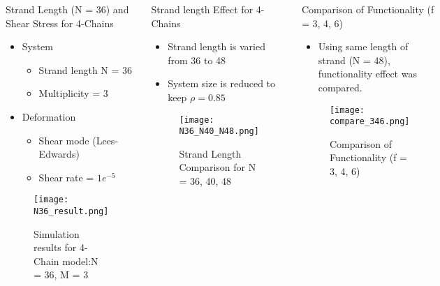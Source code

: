 \begin{columns}[totalwidth=.85\linewidth]
	\column{\textwidth}
	\vspace{-10mm}
		\begin{itembox}[l]{Strand Length (N = 36) and Shear Stress for 4-Chains}
			\begin{itemize}
				\item System
				\begin{itemize}
					\item Strand length N = 36
					\item Multiplicity = 3
				\end{itemize}
				\item Deformation
				\begin{itemize}
					\item Shear mode (Lees-Edwards)
					\item Shear rate = $1e^{-5}$
				\end{itemize}
			\end{itemize}

			\begin{figure}[htb]
				\centering
					\texttt{[image: N36\_result.png]}
					\caption{Simulation results for 4-Chain model:N = 36, M = 3}
					\label{4_N36}
			\end{figure}
		\end{itembox}

		\begin{itembox}[l]{Strand length Effect for 4-Chains}
			\begin{itemize}
				\item Strand length is varied from 36 to 48
				\item System size is reduced to keep $\rho = 0.85$
			\end{itemize}

			\begin{figure}[htb]
				\centering
					\texttt{[image: N36\_N40\_N48.png]}
					\caption{Strand Length Comparison for N = 36, 40, 48}
					\label{4_N364048}
			\end{figure}
		\end{itembox}

		\begin{itembox}[l]{Comparison of Functionality (f = 3, 4, 6)}
			\begin{itemize}
				\item Using same length of strand (N = 48), functionality effect was compared.
			\end{itemize}

			\begin{figure}[htb]
				\centering
					\texttt{[image: compare\_346.png]}
					\caption{Comparison of Functionality (f = 3, 4, 6)}
					\label{N48_f346}
			\end{figure}
		\end{itembox}
\end{columns}